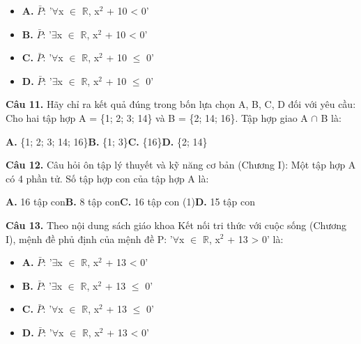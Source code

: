\documentclass[11pt,a4paper]{article}
\begin{document}
\begin{itemize}\setlength{\itemsep}{1pt}\setlength{\parskip}{0pt}
  \item[] \textbf{A.} $\bar{P}$: '$\forall$x $\in$ $\mathbb{R}$, x$^2$ + 10 < 0'
  \item[] \textbf{B.} $\bar{P}$: '$\exists$x $\in$ $\mathbb{R}$, x$^2$ + 10 < 0'
  \item[] \textbf{C.} $\bar{P}$: '$\forall$x $\in$ $\mathbb{R}$, x$^2$ + 10 $\le$ 0'
  \item[] \textbf{D.} $\bar{P}$: '$\exists$x $\in$ $\mathbb{R}$, x$^2$ + 10 $\le$ 0'
\end{itemize}\vspace{2pt}
\textbf{\color{primary} Câu 11.} Hãy chỉ ra kết quả đúng trong bốn lựa chọn A, B, C, D đối với yêu cầu: Cho hai tập hợp A = \{1; 2; 3; 14\} và B = \{2; 14; 16\}. Tập hợp giao A $\cap$ B là:\par
\hspace*{1.5em}\textbf{A.} \{1; 2; 3; 14; 16\}\quad\quad \textbf{B.} \{1; 3\}\quad\quad \textbf{C.} \{16\}\quad\quad \textbf{D.} \{2; 14\}\par\vspace{2pt}
\textbf{\color{primary} Câu 12.} Câu hỏi ôn tập lý thuyết và kỹ năng cơ bản (Chương I): Một tập hợp A có 4 phần tử. Số tập hợp con của tập hợp A là:\par
\hspace*{1.5em}\textbf{A.} 16 tập con\quad\quad \textbf{B.} 8 tập con\quad\quad \textbf{C.} 16 tập con (1)\quad\quad \textbf{D.} 15 tập con\par\vspace{2pt}
\textbf{\color{primary} Câu 13.} Theo nội dung sách giáo khoa Kết nối tri thức với cuộc sống (Chương I), mệnh đề phủ định của mệnh đề P: '$\forall$x $\in$ $\mathbb{R}$, x$^2$ + 13 > 0' là:\par
\begin{itemize}\setlength{\itemsep}{1pt}\setlength{\parskip}{0pt}
  \item[] \textbf{A.} $\bar{P}$: '$\exists$x $\in$ $\mathbb{R}$, x$^2$ + 13 < 0'
  \item[] \textbf{B.} $\bar{P}$: '$\exists$x $\in$ $\mathbb{R}$, x$^2$ + 13 $\le$ 0'
  \item[] \textbf{C.} $\bar{P}$: '$\forall$x $\in$ $\mathbb{R}$, x$^2$ + 13 $\le$ 0'
  \item[] \textbf{D.} $\bar{P}$: '$\forall$x $\in$ $\mathbb{R}$, x$^2$ + 13 < 0'
\end{itemize}\vspace{2pt}
\end{document}
